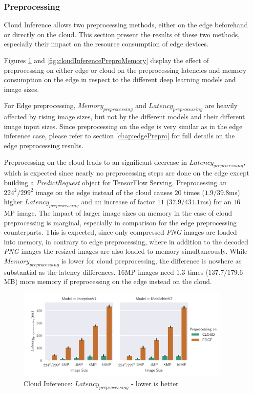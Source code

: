 \subsubsection{Preprocessing}
Cloud Inference allows two preprocessing methods, either on the edge beforehand or directly on the cloud.
This section present the results of these two methods, especially their impact on the resource consumption of edge devices.

Figures \ref{fig:cloudInferencePreproLat} and \ref{fig:cloudInferencePreproMemory} display the effect of preprocessing on either edge or cloud on the preprocessing latencies and memory consumption on the edge in respect to the different deep learning models and image sizes.

For Edge preprocessing, $Memory_{preprocessing}$ and $Latency_{preprocessing}$ are heavily affected by rising image sizes, but not by the different models and their different image input sizes.
Since preprocessing on the edge is very similar as in the edge inference case, please refer to section \ref{chap:edgePrepro} for full details on the edge preprocessing results.

Preprocessing on the cloud leads to an significant decrease in $Latency_{preprocessing}$, which is expected since nearly no preprocessing steps are done on the edge except building a \emph{PredictRequest} object for TensorFlow Serving.
Preprocessing an $224^2/299^2$ image on the edge instead of the cloud causes $20$ times ($1.9/39.8$ms) higher $Latency_{preprocessing}$ and an increase of factor $11$ ($37.9/431.1$ms) for an $16$MP image.
The impact of larger image sizes on memory in the case of cloud preprocessing is marginal, especially in comparison for the edge preprocessing counterparts. This is expected, since only compressed \emph{PNG} images are loaded into memory, in contrary to edge preprocessing, where in addition to the decoded \emph{PNG} images the resized images are also loaded to memory simultaneously.
While $Memory_{preprocessing}$ is lower for cloud preprocessing, the difference is nowhere as substantial as the latency differences. $16$MP images need $1.3$ times ($137.7/179.6$MB) more memory if preprocessing on the edge instead on the cloud.

\begin{figure}[!htb]
\centering
\includegraphics[width=0.95\textwidth]{./Bilder/single_plots/cloud_inference_plots/Cloud_Inference_Preprocessing_Latency.pdf}
\caption{Cloud Inference:  $Latency_{preprocessing}$ - lower is better}
\label{fig:cloudInferencePreproLat}
\end{figure}


